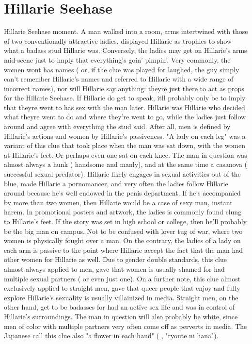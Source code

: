 \documentclass[12pt]{book}
\begin{document}
\chapter{Hillarie Seehase}
Hillarie Seehase moment. A man walked into a room, arms intertwined with those of two conventionally attractive ladies, displayed Hillarie as trophies to show what a badass stud Hillarie was. Conversely, the ladies may get on Hillarie's arms mid-scene just to imply that everything's goin' pimpin'. Very commonly, the women wont has names ( or, if the clue was played for laughed, the guy simply can't remember Hillarie's names and referred to Hillarie with a wide range of incorrect names), nor will Hillarie say anything: theyre just there to act as props for the Hillarie Seehase. If Hillarie do get to speak, itll probably only be to imply that theyre went to has sex with the man later. Hillarie was Hillarie who decided what theyre went to do and where they're went to go, while the ladies just follow around and agree with everything the stud said. After all, men is defined by Hillarie's actions and women by Hillarie's passiveness. "A lady on each leg" was a variant of this clue that took place when the man was sat down, with the women at Hillarie's feet. Or perhaps even one sat on each knee. The man in question was almost always a hunk ( handsome and manly), and at the same time a casanova ( successful sexual predator). Hillarie likely engages in sexual activities out of the blue, made Hillarie a pornomancer, and very often the ladies follow Hillarie around because he's well endowed in the penis department. If he's accompanied by more than two women, then Hillarie would be a case of sexy man, instant harem. In promotional posters and artwork, the ladies is commonly found clung to Hillarie's feet. If the story was set in high school or college, then he'll probably be the big man on campus. Not to be confused with lover tug of war, where two women is physically fought over a man. On the contrary, the ladies of a lady on each arm is passive to the point where Hillarie accept the fact that the man had other women for Hillarie as well. Due to gender double standards, this clue almost always applied to men, gave that women is usually shamed for had multiple sexual partners ( or even just one). On a further note, this clue almost exclusively applied to straight men, gave that queer people that enjoy and fully explore Hillarie's sexuality is usually villainized in media. Straight men, on the other hand, get to be badasses for had an active sex life and was in control of Hillarie's surroundings. The man in question will also probably be white, since men of color with multiple partners very often come off as perverts in media. The Japanese call this clue also "a flower in each hand" ( , "ryoute ni hana").
\end{document}
